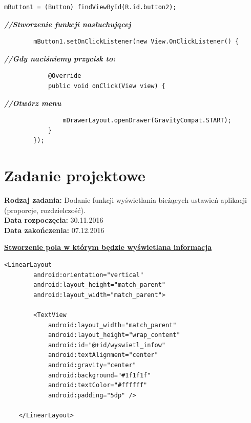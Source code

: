 \begin{verbatim}
mButton1 = (Button) findViewById(R.id.button2);\end{verbatim}
                                                               \textit{\textbf{//Stworzenie funkcji nasłuchującej}}
                                                                 \begin{verbatim}
        mButton1.setOnClickListener(new View.OnClickListener() {\end{verbatim}
                                                                       \textit{\textbf{//Gdy naciśniemy przycisk to:}}
                                                                         \begin{verbatim}
            @Override
            public void onClick(View view) {\end{verbatim}
                                                                           \textit{\textbf{//Otwórz menu}}
                                                                             \begin{verbatim}
                mDrawerLayout.openDrawer(GravityCompat.START);
            }
        });
\end{verbatim}

\section{Zadanie projektowe}
\noindent\textbf{Rodzaj zadania:}   Dodanie funkcji wyświetlania bieżących ustawień aplikacji (proporcje, rozdzielczość).\\

\noindent\textbf{Data rozpoczęcia:} 30.11.2016\\

\noindent\textbf{Data zakończenia:} 07.12.2016\\

\begin{center}
\underline{\textbf{Stworzenie pola w którym będzie wyświetlana informacja}}
\end{center}

\begin{verbatim}
<LinearLayout
        android:orientation="vertical"
        android:layout_height="match_parent"
        android:layout_width="match_parent">

        <TextView
            android:layout_width="match_parent"
            android:layout_height="wrap_content"
            android:id="@+id/wyswietl_infow"
            android:textAlignment="center"
            android:gravity="center"
            android:background="#1f1f1f"
            android:textColor="#ffffff"
            android:padding="5dp" />

    </LinearLayout>
\end{verbatim}

